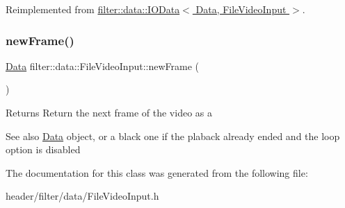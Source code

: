 Reimplemented from \hyperlink{classfilter_1_1data_1_1_i_o_data}{filter\+::data\+::\+I\+O\+Data$<$ Data, File\+Video\+Input $>$}.

\mbox{\label{classfilter_1_1data_1_1_file_video_input_a01a93b368b1a8192c47490ff554ad30f}} 
\subsubsection{\texorpdfstring{new\+Frame()}{newFrame()}}
{\footnotesize\ttfamily \hyperlink{classfilter_1_1data_1_1_data}{Data} filter\+::data\+::\+File\+Video\+Input\+::new\+Frame (\begin{DoxyParamCaption}{ }\end{DoxyParamCaption})\hspace{0.3cm}{\ttfamily [inline]}}

\begin{DoxyReturn}{Returns}
Return the next frame of the video as a 
\end{DoxyReturn}
\begin{DoxySeeAlso}{See also}
\hyperlink{classfilter_1_1data_1_1_data}{Data} object, or a black one if the plaback already ended and the loop option is disabled 
\end{DoxySeeAlso}


The documentation for this class was generated from the following file\+:\begin{DoxyCompactItemize}
\item 
header/filter/data/File\+Video\+Input.\+h\end{DoxyCompactItemize}
